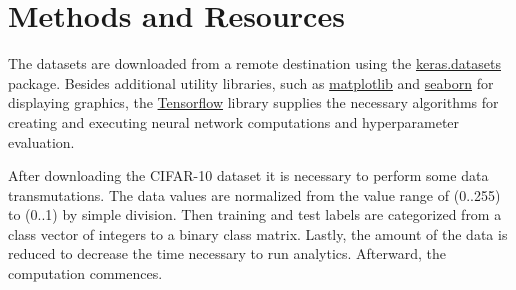 \chapter{Methods and Resources}
The datasets are downloaded from a remote destination using the \href{https://keras.io/api/datasets/cifar10/}{keras.datasets} package.
Besides additional utility libraries, such as \href{https://matplotlib.org/}{matplotlib} and \href{https://seaborn.pydata.org/}{seaborn} for displaying graphics, the \href{https://www.tensorflow.org/}{Tensorflow} library supplies the necessary algorithms for creating and executing neural network computations and hyperparameter evaluation.

After downloading the CIFAR-10 dataset it is necessary to perform some data transmutations.
The data values are normalized from the value range of (0..255) to (0..1) by simple division. Then training and test labels are categorized from a class vector of integers to a binary class matrix. Lastly, the amount of the data is reduced to decrease the time necessary to run analytics.
Afterward, the computation commences.